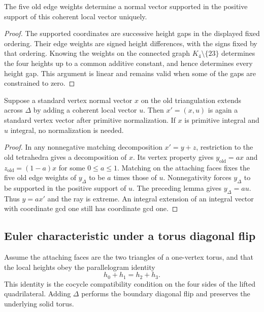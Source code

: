 \begin{lemma}
The five old edge weights determine a normal vector supported in the
positive support of this coherent local vector uniquely.
\end{lemma}

\begin{proof}
The supported coordinates are successive height gaps in the displayed
fixed ordering.  Their edge weights are signed height differences, with
the signs fixed by that ordering.  Knowing the weights on the connected
graph $K_4\setminus\{23\}$ determines the four heights up to a common
additive constant, and hence determines every height gap.  This argument
is linear and remains valid when some of the gaps are constrained to zero.
\end{proof}

\begin{proposition}
Suppose a standard vertex normal vector $x$ on the old triangulation
extends across $\Delta$ by adding a coherent local vector $u$.  Then
$x'=(x,u)$ is again a standard vertex vector after primitive normalization.
If $x$ is primitive integral and $u$ integral, no normalization is needed.
\end{proposition}

\begin{proof}
In any nonnegative matching decomposition $x'=y+z$, restriction to the old
tetrahedra gives a decomposition of $x$.  Its vertex property gives
$y_{\mathrm{old}}=a x$ and $z_{\mathrm{old}}=(1-a)x$ for some
$0\leq a\leq1$.  Matching on the attaching faces fixes the five old edge
weights of $y_\Delta$ to be $a$ times those of $u$.  Nonnegativity forces
$y_\Delta$ to be supported in the positive support of $u$.  The preceding
lemma gives $y_\Delta=au$.  Thus $y=ax'$ and the ray is extreme.  An
integral extension of an integral vector with coordinate gcd one still
has coordinate gcd one.
\end{proof}

\subsection{Euler characteristic under a torus diagonal flip}

Assume the attaching faces are the two triangles of a one-vertex torus,
and that the local heights obey the parallelogram identity
\[
 h_0+h_1=h_2+h_3.                                      \tag{P}
\]
This identity is the cocycle compatibility condition on the four sides
of the lifted quadrilateral.  Adding $\Delta$ performs the boundary
diagonal flip and preserves the underlying solid torus.

